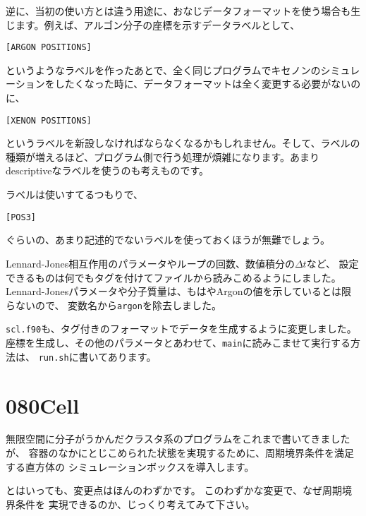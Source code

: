 \documentclass[a4,10pt]{article}
\begin{document}
逆に、当初の使い方とは違う用途に、おなじデータフォーマットを使う場合も生じます。例えば、アルゴン分子の座標を示すデータラベルとして、
\begin{screen}\begin{verbatim}
[ARGON POSITIONS]
\end{verbatim}\end{screen}
というようなラベルを作ったあとで、全く同じプログラムでキセノンのシミュレーションをしたくなった時に、データフォーマットは全く変更する必要がないのに、
\begin{screen}\begin{verbatim}
[XENON POSITIONS]
\end{verbatim}\end{screen}
というラベルを新設しなければならなくなるかもしれません。そして、ラベルの種類が増えるほど、プログラム側で行う処理が煩雑になります。あまりdescriptiveなラベルを使うのも考えものです。

ラベルは使いすてるつもりで、
\begin{screen}\begin{verbatim}
[POS3]
\end{verbatim}\end{screen}
ぐらいの、あまり記述的でないラベルを使っておくほうが無難でしょう。

Lennard-Jones相互作用のパラメータやループの回数、数値積分の$\Delta t$など、
設定できるものは何でもタグを付けてファイルから読みこめるようにしました。
Lennard-Jonesパラメータや分子質量は、もはやArgonの値を示しているとは限らないので、
変数名から{\tt argon}を除去しました。

{\tt scl.f90}も、タグ付きのフォーマットでデータを生成するように変更しました。
座標を生成し、その他のパラメータとあわせて、{\tt main}に読みこませて実行する方法は、
{\tt run.sh}に書いてあります。


\section{080Cell}

無限空間に分子がうかんだクラスタ系のプログラムをこれまで書いてきましたが、
容器のなかにとじこめられた状態を実現するために、周期境界条件を満足する直方体の
シミュレーションボックスを導入します。

とはいっても、変更点はほんのわずかです。
このわずかな変更で、なぜ周期境界条件を
実現できるのか、じっくり考えてみて下さい。
\end{document}
